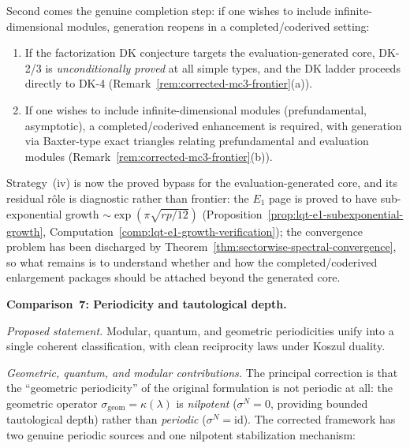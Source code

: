 \begin{remark}
Second comes the genuine completion step: if one wishes to include
infinite-dimensional modules, generation reopens in a
completed/coderived setting:
\begin{enumerate}[label=\textup{(\alph*)}]
\item If the factorization DK conjecture targets the
  evaluation-generated core, DK-2/3 is
  \emph{unconditionally proved} at all simple types, and the DK ladder
  proceeds directly to DK-4
  (Remark~\ref{rem:corrected-mc3-frontier}(a)).
\item If one wishes to include infinite-dimensional modules
  (prefundamental, asymptotic), a completed/coderived
  enhancement is required, with generation via Baxter-type
  exact triangles relating prefundamental and evaluation
  modules (Remark~\ref{rem:corrected-mc3-frontier}(b)).
\end{enumerate}

Strategy~(iv) is now the proved bypass for the evaluation-generated
core, and its residual rôle is diagnostic rather than frontier:
the $E_1$ page is proved to have
sub-exponential growth $\sim \exp(\pi\sqrt{rp/12})$
(Proposition~\ref{prop:lqt-e1-subexponential-growth},
Computation~\ref{comp:lqt-e1-growth-verification});
the convergence problem has been discharged by
Theorem~\ref{thm:sectorwise-spectral-convergence}, so what remains is
to understand whether and how the completed/coderived enlargement
packages should be attached beyond the generated core.
\end{remark}

\medskip

\noindent\textbf{Comparison~7: Periodicity and tautological depth.}

\emph{Proposed statement.}
Modular, quantum, and geometric periodicities unify into a single
coherent classification, with clean reciprocity laws under Koszul
duality.

\emph{Geometric, quantum, and modular contributions.}
The principal correction is that the ``geometric periodicity'' of
the original formulation is not periodic at all: the geometric operator
$\sigma_{\mathrm{geom}} = \kappa(\lambda)$ is \emph{nilpotent}
($\sigma^N = 0$, providing bounded tautological depth) rather than
\emph{periodic} ($\sigma^N = \mathrm{id}$).  The corrected
framework has two genuine periodic sources and one nilpotent
stabilization mechanism:

